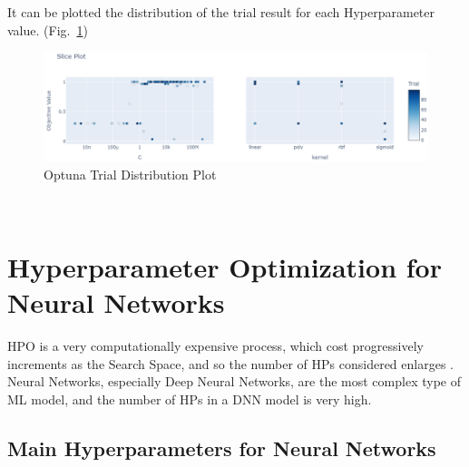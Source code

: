 \newline It can be plotted the distribution of the trial result for each Hyperparameter value. (Fig.~\ref{fig:figure-2.5.4})
\begin{figure}[t]
	\centering
	\includegraphics[width=15cm]{figures/figure-2.5.4.png}
	\caption[Optuna Trial Distribution Plot]{Optuna Trial Distribution Plot}
	\label{fig:figure-2.5.4}
\end{figure}
\\[2.5cm]

\section{Hyperparameter Optimization for Neural Networks}

HPO is a very computationally expensive process, which cost progressively increments as the Search Space, and so the number of HPs considered enlarges \cite{Tesi-1.9}.
Neural Networks, especially Deep Neural Networks, are the most complex type of ML model, and the number of HPs in a DNN model is very high.

\subsection{Main Hyperparameters for Neural Networks}

